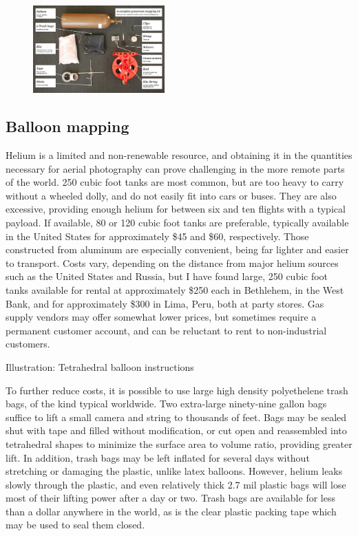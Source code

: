 \documentclass[11pt]{report}
\begin{document}
\begin{figure}
	\begin{flushright}
		\includegraphics[width=0.45\textwidth]{images/100-dollar-satellite-poster.jpg}
	\end{flushright}
\end{figure}

\subsection{Balloon mapping}

Helium is a limited and non-renewable resource, and obtaining it in the quantities necessary for aerial photography can prove challenging in the more remote parts of the world. 250 cubic foot tanks are most common, but are too heavy to carry without a wheeled dolly, and do not easily fit into cars or buses. They are also excessive, providing enough helium for between six and ten flights with a typical payload. If available, 80 or 120 cubic foot tanks are preferable, typically available in the United States for approximately \$45 and \$60, respectively. Those constructed from aluminum are especially convenient, being far lighter and easier to transport. Costs vary, depending on the distance from major helium sources such as the United States and Russia, but I have found large, 250 cubic foot tanks available for rental at approximately \$250 each in Bethlehem, in the West Bank, and for approximately \$300 in Lima, Peru, both at party stores. Gas supply vendors may offer somewhat lower prices, but sometimes require a permanent customer account, and can be reluctant to rent to non-industrial customers. 

Illustration: Tetrahedral balloon instructions

To further reduce costs, it is possible to use large high density polyethelene trash bags, of the kind typical worldwide. Two extra-large ninety-nine gallon bags suffice to lift a small camera and string to thousands of feet. Bags may be sealed shut with tape and filled without modification, or cut open and reassembled into tetrahedral shapes to minimize the surface area to volume ratio, providing greater lift. In addition, trash bags may be left inflated for several days without stretching or damaging the plastic, unlike latex balloons. However, helium leaks slowly through the plastic, and even relatively thick 2.7 mil plastic bags will lose most of their lifting power after a day or two. Trash bags are available for less than a dollar anywhere in the world, as is the clear plastic packing tape which may be used to seal them closed.  
\end{document}
